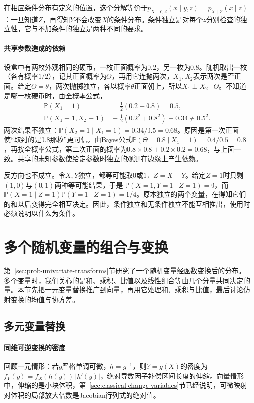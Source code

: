 在相应条件分布有定义的位置，这个分解等价于$p_{X\mid Y,Z}(x\mid y,z)=p_{X\mid Z}(x\mid z)$：一旦知道$Z$，再得知$Y$不会改变$X$的条件分布。条件独立是对每个$z$分别检查的独立性，它与不加条件的独立是两种不同的要求。

\paragraph{共享参数造成的依赖}
设盒中有两枚外观相同的硬币，一枚正面概率为$0.2$，另一枚为$0.8$。随机取出一枚（各有概率$1/2$），记其正面概率为$\Theta$，再用它连抛两次，$X_1,X_2$表示两次是否正面。给定$\Theta=\theta$，两次抛掷独立，各以概率$\theta$正面朝上，所以$X_1\perp X_2\mid\Theta$。不知道是哪一枚硬币时，由全概率公式，
\[
\begin{aligned}
 \mathbb P(X_1=1)&=\tfrac12(0.2+0.8)=0.5,\\
 \mathbb P(X_1=1,X_2=1)&=\tfrac12(0.2^2+0.8^2)=0.34\neq0.5^2 .
\end{aligned}
\]
两次结果不独立：$\mathbb P(X_2=1\mid X_1=1)=0.34/0.5=0.68$。原因是第一次正面使“取到的是$0.8$那枚”更可信。由Bayes公式$\mathbb P(\Theta=0.8\mid X_1=1)=0.4/0.5=0.8$，再按全概率公式，第二次正面的概率为$0.8\times0.8+0.2\times0.2=0.68$，与上面一致。共享的未知参数使给定参数时独立的观测在边缘上产生依赖。

反方向也不成立。令$X,Y$独立，都等可能取$0$或$1$，$Z=X+Y$。给定$Z=1$时只剩$(1,0)$与$(0,1)$两种等可能结果，于是
$\mathbb P(X=1,Y=1\mid Z=1)=0$，而$\mathbb P(X=1\mid Z=1)\mathbb P(Y=1\mid Z=1)=1/4$。原本独立的两个变量，在得知它们的和以后变得完全相互决定。因此，条件独立和无条件独立不能互相推出，使用时必须说明以什么为条件。

\section{多个随机变量的组合与变换}
\label{sec:rvec-transforms}
\label{sec:rv-combinations}

第~\ref{sec:prob-univariate-transforms}节研究了一个随机变量经函数变换后的分布。多个变量时，我们关心的是和、乘积、比值以及线性组合等由几个分量共同决定的量。本节先把一元变量替换推广到向量，再用它处理和、乘积与比值，最后讨论仿射变换的均值与协方差。

\subsection{多元变量替换}

\paragraph{同维可逆变换的密度}
回顾一元情形：若$g$严格单调可微，$h=g^{-1}$，则$Y=g(X)$的密度为$f_Y(y)=f_X(h(y))\,|h'(y)|$，绝对导数因子补偿区间长度的伸缩。向量情形中，伸缩的是小块体积，第~\ref{sec:classical-change-variables}节已经说明，可微映射对体积的局部放大倍数是Jacobian行列式的绝对值。

